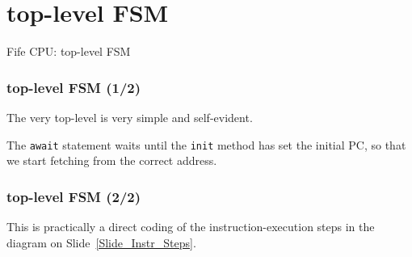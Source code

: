 
\section{top-level FSM}

\begin{frame}[fragile]

\begin{center}
  {\LARGE Fife CPU: top-level FSM}
\end{center}

\end{frame}


\begin{frame}[fragile]
\frametitle{top-level FSM (1/2)}

\footnotesize

\begin{minipage}{0.725\textwidth}
\end{minipage}

\vspace{5ex}

The very top-level is very simple and self-evident.

\vspace{2ex}

The {\tt await} statement waits until the {\tt init} method has set
the initial PC, so that we start fetching from the correct address.

\end{frame}


\begin{frame}[fragile]
\frametitle{top-level FSM (2/2)}

\footnotesize

\begin{minipage}{0.5\textwidth}
\end{minipage}
\hm
\begin{minipage}{0.45\textwidth}
 This is practically a direct coding of the instruction-execution steps
 in the diagram on Slide~\ref{Slide_Instr_Steps}.
\end{minipage}


\end{frame}

